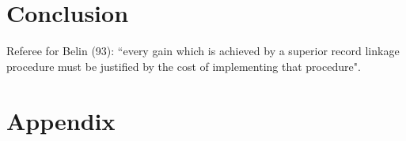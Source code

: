 \documentclass[11pt,reqno]{amsart}
\begin{document}
\section{Conclusion}

Referee for Belin (93): ``every gain which is achieved by a superior record linkage procedure must be justified by the cost of implementing that procedure". 



\newpage




\newpage
\appendix
\section{Appendix}
\end{document}
